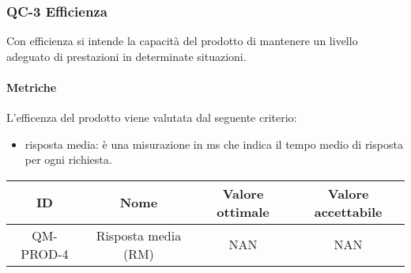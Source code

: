 \subsubsection{QC-3 Efficienza}
Con efficienza si intende la capacità del prodotto di mantenere un livello adeguato di prestazioni in determinate situazioni.
	
	\paragraph{Metriche}
	L'efficenza del prodotto viene valutata dal seguente criterio:
	\begin{itemize}
		\item risposta media: è una misurazione in ms che indica il tempo medio di risposta per ogni richiesta.
	\end{itemize}
	\begin{center}
		\begin{tabular}{|c|c|c|c|}
			\rowcolor{lighter-grayer}
			\hline
			ID & Nome & Valore ottimale & Valore accettabile \\
			\hline
			QM-PROD-4 & Risposta media (RM) & NAN & NAN \\
			\hline
		\end{tabular}
	\end{center}
